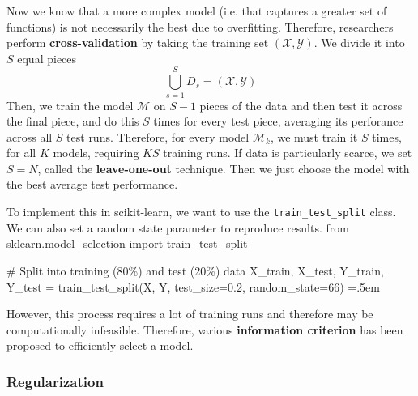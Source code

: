 \documentclass{article}
\theoremstyle{definition}
\newenvironment{cverbatim}
    {\SaveVerbatim{cverb}}
    {\endSaveVerbatim
    \flushleft\fboxrule=0pt\fboxsep=.5em
    \colorbox{cverbbg}{%
      \makebox[\dimexpr\linewidth-2\fboxsep][l]{\BUseVerbatim{cverb}}%
    }
    \endflushleft
  }
\begin{document}
    Now we know that a more complex model (i.e. that captures a greater set of functions) is not necessarily the best due to overfitting. Therefore, researchers perform \textbf{cross-validation} by taking the training set $(\mathcal{X}, \mathcal{Y})$. We divide it into $S$ equal pieces 
    \[\bigcup_{s=1}^S D_s = (\mathcal{X}, \mathcal{Y})\]
    Then, we train the model $\mathcal{M}$ on $S-1$ pieces of the data and then test it across the final piece, and do this $S$ times for every test piece, averaging its perforance across all $S$ test runs. Therefore, for every model $\mathcal{M}_k$, we must train it $S$ times, for all $K$ models, requiring $KS$ training runs. If data is particularly scarce, we set $S = N$, called the \textbf{leave-one-out} technique. Then we just choose the model with the best average test performance. 

    To implement this in scikit-learn, we want to use the \texttt{train\_test\_split} class. We can also set a random state parameter to reproduce results. 
    \begin{cverbatim}
    from sklearn.model_selection import train_test_split 

    # Split into training (80\%) and test (20\%) data 
    X_train, X_test, Y_train, Y_test = train_test_split(X, Y, test_size=0.2, 
                                                        random_state=66)
    \end{cverbatim}

    However, this process requires a lot of training runs and therefore may be computationally infeasible. Therefore, various \textbf{information criterion} has been proposed to efficiently select a model. 


    \subsubsection{Regularization}
\end{document}
